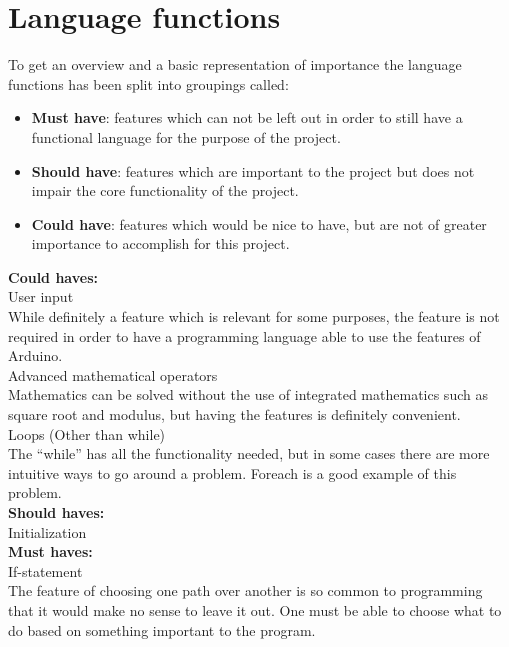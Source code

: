 \section{Language functions}
To get an overview and a basic representation of importance the language functions has been split into groupings called:
\begin{itemize}
\item \textbf{Must have}: features which can not be left out in order to still have a functional language for the purpose of the project.
\item \textbf{Should have}: features which are important to the project but does not impair the core functionality of the project.
\item \textbf{Could have}: features which would be nice to have, but are not of greater importance to accomplish for this project.
\end{itemize}

\textbf{Could haves:} \\

User input \\
While definitely a feature which is relevant for some purposes, the feature is not required in order to have a programming language able to use the features of Arduino. \\

Advanced mathematical operators \\
Mathematics can be solved without the use of integrated mathematics such as square root and modulus, but having the features is definitely convenient. \\

Loops (Other than while) \\
The ``while'' has all the functionality needed, but in some cases there are more intuitive ways to go around a problem. Foreach is a good example of this problem.\\

\textbf{Should haves:} \\

Initialization \\


\textbf{Must haves:} \\

If-statement \\
The feature of choosing one path over another is so common to programming that it would make no sense to leave it out. One must be able to choose what to do based on something important to the program. \\

